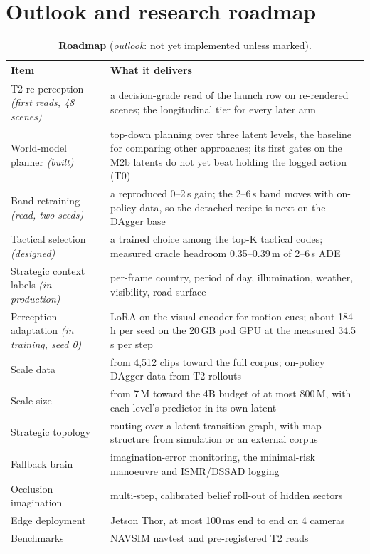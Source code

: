 \documentclass[10pt,twocolumn]{article}
\theoremstyle{remark}
\newcommand{\tier}[1]{\textsc{\small #1}}
\begin{document}
\section{Outlook and research roadmap}\label{sec:outlook}
\begin{table}[t]
\centering
\caption{\textbf{Roadmap} (\emph{outlook}: not yet implemented unless marked).}
\label{tab:roadmap}
\small
\begin{tabularx}{\columnwidth}{@{}>{\raggedright\arraybackslash}p{24mm}>{\raggedright\arraybackslash}X@{}}
\toprule
Item & What it delivers \\
\midrule
T2 re-perception \textit{(first reads, 48 scenes)} & a decision-grade read of the launch row on re-rendered scenes; the longitudinal tier for every later arm \\
World-model planner \textit{(built)} & top-down planning over three latent levels, the baseline for comparing other approaches; its first gates on the M2b latents do not yet beat holding the logged action (\tier{T0}) \\
Band retraining \textit{(read, two seeds)} & a reproduced 0--2\,s gain; the 2--6\,s band moves with on-policy data, so the detached recipe is next on the DAgger base \\
Tactical selection \textit{(designed)} & a trained choice among the top-K tactical codes; measured oracle headroom 0.35--0.39\,m of 2--6\,s ADE \\
Strategic context labels \textit{(in production)} & per-frame country, period of day, illumination, weather, visibility, road surface \\
Perception adaptation \textit{(in training, seed 0)} & LoRA on the visual encoder for motion cues; about 184\,h per seed on the 20\,GB pod GPU at the measured 34.5\,s per step \\
Scale data & from 4,512 clips toward the full corpus; on-policy DAgger data from T2 rollouts \\
Scale size & from 7\,M toward the 4B budget of at most 800\,M, with each level's predictor in its own latent \\
Strategic topology & routing over a latent transition graph, with map structure from simulation or an external corpus \\
Fallback brain & imagination-error monitoring, the minimal-risk manoeuvre and ISMR/DSSAD logging \\
Occlusion imagination & multi-step, calibrated belief roll-out of hidden sectors \\
Edge deployment & Jetson Thor, at most 100\,ms end to end on 4 cameras \\
Benchmarks & NAVSIM navtest and pre-registered T2 reads \\
\bottomrule
\end{tabularx}
\end{table}
\end{document}
